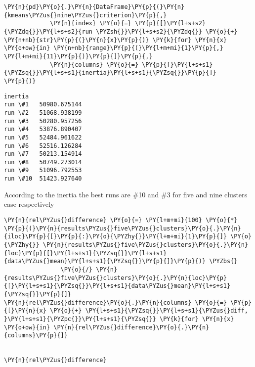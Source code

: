     \begin{tcolorbox}[breakable, size=fbox, boxrule=1pt, pad at break*=1mm,colback=cellbackground, colframe=cellborder]
\begin{Verbatim}[commandchars=\\\{\}]
\PY{n}{pd}\PY{o}{.}\PY{n}{DataFrame}\PY{p}{(}\PY{n}{kmeans\PYZus{}nine\PYZus{}criterion}\PY{p}{,} 
             \PY{n}{index} \PY{o}{=} \PY{p}{[}\PY{l+s+s2}{\PYZdq{}}\PY{l+s+s2}{run \PYZsh{}}\PY{l+s+s2}{\PYZdq{}} \PY{o}{+} \PY{n+nb}{str}\PY{p}{(}\PY{n}{x}\PY{p}{)} \PY{k}{for} \PY{n}{x} \PY{o+ow}{in} \PY{n+nb}{range}\PY{p}{(}\PY{l+m+mi}{1}\PY{p}{,} \PY{l+m+mi}{11}\PY{p}{)}\PY{p}{]}\PY{p}{,} 
             \PY{n}{columns} \PY{o}{=} \PY{p}{[}\PY{l+s+s1}{\PYZsq{}}\PY{l+s+s1}{inertia}\PY{l+s+s1}{\PYZsq{}}\PY{p}{]}
\PY{p}{)}
\end{Verbatim}
\end{tcolorbox}

            \begin{tcolorbox}[breakable, size=fbox, boxrule=.5pt, pad at break*=1mm, opacityfill=0]
\begin{Verbatim}[commandchars=\\\{\}]
              inertia
run \#1   50980.675144
run \#2   51068.938199
run \#3   50280.957256
run \#4   53876.890407
run \#5   52484.961622
run \#6   52516.126284
run \#7   50213.154914
run \#8   50749.273014
run \#9   51096.792553
run \#10  51423.927640
\end{Verbatim}
\end{tcolorbox}
        
    According to the inertia the best runs are \#10 and \#3 for five and
nine clusters case respectively

    \begin{tcolorbox}[breakable, size=fbox, boxrule=1pt, pad at break*=1mm,colback=cellbackground, colframe=cellborder]
\begin{Verbatim}[commandchars=\\\{\}]
\PY{n}{rel\PYZus{}difference} \PY{o}{=} \PY{l+m+mi}{100} \PY{o}{*} \PY{p}{(}\PY{n}{results\PYZus{}five\PYZus{}clusters}\PY{o}{.}\PY{n}{iloc}\PY{p}{[}\PY{p}{:}\PY{o}{\PYZhy{}}\PY{l+m+mi}{1}\PY{p}{]} \PY{o}{\PYZhy{}} \PY{n}{results\PYZus{}five\PYZus{}clusters}\PY{o}{.}\PY{n}{loc}\PY{p}{[}\PY{l+s+s1}{\PYZsq{}}\PY{l+s+s1}{data\PYZus{}mean}\PY{l+s+s1}{\PYZsq{}}\PY{p}{]}\PY{p}{)} \PYZbs{}
                \PY{o}{/} \PY{n}{results\PYZus{}five\PYZus{}clusters}\PY{o}{.}\PY{n}{loc}\PY{p}{[}\PY{l+s+s1}{\PYZsq{}}\PY{l+s+s1}{data\PYZus{}mean}\PY{l+s+s1}{\PYZsq{}}\PY{p}{]}
\PY{n}{rel\PYZus{}difference}\PY{o}{.}\PY{n}{columns} \PY{o}{=} \PY{p}{[}\PY{n}{x} \PY{o}{+} \PY{l+s+s1}{\PYZsq{}}\PY{l+s+s1}{\PYZus{}diff, }\PY{l+s+s1}{\PYZpc{}}\PY{l+s+s1}{\PYZsq{}} \PY{k}{for} \PY{n}{x} \PY{o+ow}{in} \PY{n}{rel\PYZus{}difference}\PY{o}{.}\PY{n}{columns}\PY{p}{]}


\PY{n}{rel\PYZus{}difference} 
\end{Verbatim}
\end{tcolorbox}


